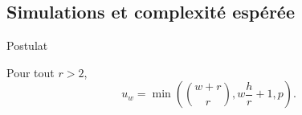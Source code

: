 \documentclass[]{beamer}
\begin{document}
\subsection{Simulations et complexité espérée}
\begin{frame}{Postulat}

\begin{postulate}
Pour tout $r > 2$,
$$ u_w = \min \left( \binom{w+r}{r}, w\frac{h}{r} + 1 , p \right).$$
\end{postulate}

\end{frame}
\end{document}
